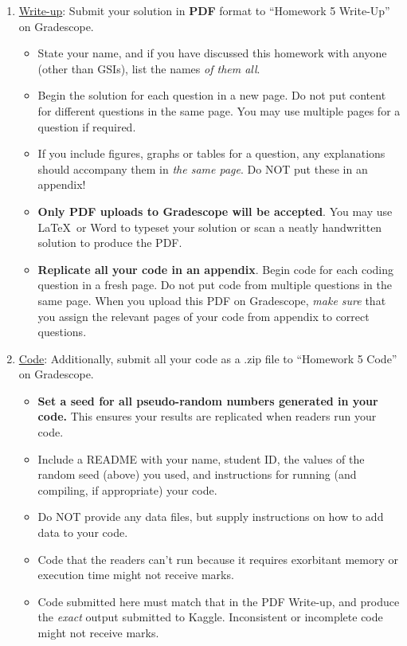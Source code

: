 \documentclass[11pt]{article}
\begin{document}
\begin{enumerate}[]
 \item \underline{Write-up}: Submit your solution in {\bf PDF} format to
		``Homework 5 Write-Up'' on Gradescope.
	\begin{itemize}    
		\item State your name, and if you have discussed this
			homework with anyone (other than GSIs), list the names \emph{of them all}. 
		\item Begin the solution for each question in a new page. 
			Do not put content for different questions in the same page.
			You may use multiple pages for a question if required.
		\item If you include figures, graphs or tables for a question,
			any explanations should accompany them in \emph{the same page}.
			Do NOT put these in an appendix!
		\item \textbf{Only PDF uploads to Gradescope will be accepted}. You may
			use \LaTeX\ or Word to typeset your solution or scan a neatly handwritten
			solution to produce the PDF. 
		\item \textbf{Replicate all your code in an appendix}. 
			Begin code for each coding question in a fresh page.
			Do not put code from multiple questions in the same page.
			When you upload this PDF on Gradescope, \emph{make sure}
			that you assign the relevant pages of your code from appendix to correct questions.
	\end{itemize}
	\item \underline{Code}: Additionally, submit all your code as a .zip file
	to ``Homework 5 Code'' on Gradescope.
	\begin{itemize}    
		\item \textbf{Set a seed for all pseudo-random numbers generated in your code.}
			This ensures your results are replicated when readers run your code.
		\item Include a README with your name, student ID,
			the values of the random seed (above) you used, and instructions
			for running (and compiling, if appropriate) your code.
		\item Do NOT provide any data files, but supply instructions on how to
			add data to your code.
		\item Code that the readers can't run because it requires exorbitant memory or execution time might not receive marks.
		\item Code submitted here must match that in the PDF Write-up,
			and produce the \emph{exact} output submitted to Kaggle.
			Inconsistent or incomplete code might not receive marks.
	\end{itemize}
\end{enumerate}
\end{document}
